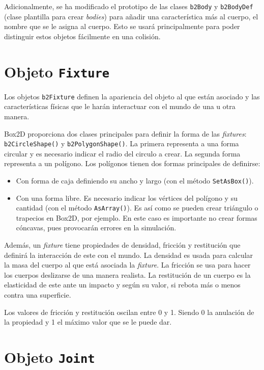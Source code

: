 Adicionalmente, se ha modificado el prototipo de las clases \texttt{b2Body} y \texttt{b2BodyDef} (clase plantilla para crear \emph{bodies}) para añadir una característica más al cuerpo, el nombre que se le asigna al cuerpo. Esto se usará principalmente para poder distinguir estos objetos fácilmente en una colisión.


\section*{Objeto \texttt{Fixture}}

Los objetos \texttt{b2Fixture} definen la apariencia del objeto al que están asociado y las características físicas que le harán interactuar con el mundo de una u otra manera.

Box2D proporciona dos clases principales para definir la forma de las \emph{fixtures}: \texttt{b2CircleShape()} y \texttt{b2PolygonShape()}. La primera representa a una forma circular y es necesario indicar el radio del circulo a crear. La segunda forma representa a un polígono. Los polígonos tienen dos formas principales de definirse:

\begin{itemize}
	\item Con forma de caja definiendo su ancho y largo (con el método \texttt{SetAsBox()}).
	\item Con una forma libre. Es necesario indicar los vértices del polígono y su cantidad (con el método \texttt{AsArray()}). Es así como se pueden crear triángulo o trapecios en Box2D, por ejemplo. En este caso es importante no crear formas cóncavas, pues provocarán errores en la simulación.
\end{itemize}


Además, un \emph{fixture} tiene propiedades de densidad, fricción y restitución que definirá la interacción de este con el mundo. La densidad es usada para calcular la masa del cuerpo al que está asociada la \emph{fixture}. La fricción se usa para hacer los cuerpos deslizarse de una manera realista. La restitución de un cuerpo es la elasticidad de este ante un impacto y según su valor, si rebota más o menos contra una superficie. 

Los valores de fricción y restitución oscilan entre 0 y 1. Siendo 0 la anulación de la propiedad y 1 el máximo valor que se le puede dar.


\section*{Objeto \texttt{Joint}}


